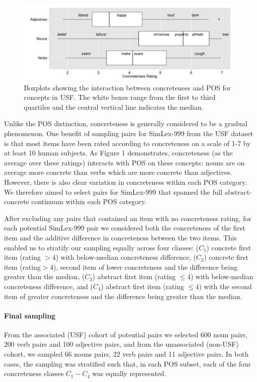\documentclass[fullname]{clv2}
\begin{document}
\begin{figure}[ht]  \includegraphics[width = \textwidth]{Figure_1_CL}  \caption{Boxplots showing the interaction between concreteness and POS for concepts in USF. The white boxes range from the first to third quartiles and the central vertical line indicates the median.}\end{figure}  

Unlike the POS distinction, concreteness  is generally considered to be a gradual phenomenon. One benefit of sampling pairs for SimLex-999 from the USF dataset is that most items have been rated according to concreteness on a scale of 1-7 by at least 10 human subjects. As Figure 1 demonstrates, concreteness (as the average over these ratings) interacts with POS on these concepts: nouns are on average more concrete than verbs which are more concrete than adjectives. However, there is also clear variation in concreteness within each POS category. We therefore aimed to select pairs for SimLex-999 that spanned the full abstract-concrete continuum within each POS category. 

After excluding any pairs that contained an item with no concreteness rating, for each potential SimLex-999 pair we considered both the concreteness of the first item and the additive difference in concreteness between the two items. This enabled us to stratify our sampling equally across four classes: (\( C_1\)) concrete first item (rating \(> 4\)) with below-median concreteness difference, (\( C_2\)) concrete first item (rating\( > 4\)), second item of lower concreteness and the difference being greater than the median, (\( C_3\)) abstract first item (rating \( \leq 4\)) with below-median concreteness difference, and (\( C_4\)) abstract first item (rating \(\leq 4\)) with the second item of greater concreteness and the difference being greater than the median. 

\paragraph{Final sampling} From the associated (USF) cohort of potential pairs we selected 600 noun pairs, 200 verb pairs and 100 adjective pairs, and from the unassociated (non-USF) cohort, we sampled 66 nouns pairs, 22 verb pairs and 11 adjective pairs. In both cases, the sampling was stratified such that, in each POS subset, each of the four concreteness classes \(C_1 - C_4\) was equally represented. 
\end{document}
